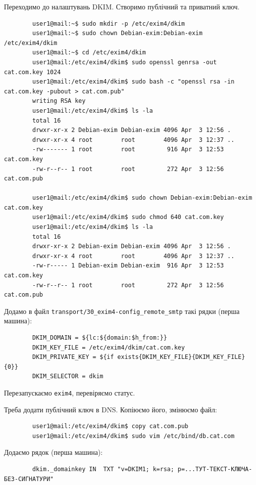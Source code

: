 \documentclass[14pt, a4paper]{extreport}
\begin{document}
	Переходимо до налаштувань DKIM.  Створимо публічний та приватний ключ.
	
	\begin{verbatim}
		user1@mail:~$ sudo mkdir -p /etc/exim4/dkim
		user1@mail:~$ sudo chown Debian-exim:Debian-exim /etc/exim4/dkim
		user1@mail:~$ cd /etc/exim4/dkim
		user1@mail:/etc/exim4/dkim$ sudo openssl genrsa -out cat.com.key 1024
		user1@mail:/etc/exim4/dkim$ sudo bash -c "openssl rsa -in cat.com.key -pubout > cat.com.pub"
		writing RSA key
		user1@mail:/etc/exim4/dkim$ ls -la
		total 16
		drwxr-xr-x 2 Debian-exim Debian-exim 4096 Apr  3 12:56 .
		drwxr-xr-x 4 root        root        4096 Apr  3 12:37 ..
		-rw------- 1 root        root         916 Apr  3 12:53 cat.com.key
		-rw-r--r-- 1 root        root         272 Apr  3 12:56 cat.com.pub
		
		user1@mail:/etc/exim4/dkim$ sudo chown Debian-exim:Debian-exim cat.com.key
		user1@mail:/etc/exim4/dkim$ sudo chmod 640 cat.com.key
		user1@mail:/etc/exim4/dkim$ ls -la
		total 16
		drwxr-xr-x 2 Debian-exim Debian-exim 4096 Apr  3 12:56 .
		drwxr-xr-x 4 root        root        4096 Apr  3 12:37 ..
		-rw-r----- 1 Debian-exim Debian-exim  916 Apr  3 12:53 cat.com.key
		-rw-r--r-- 1 root        root         272 Apr  3 12:56 cat.com.pub
	\end{verbatim}
	
	Додамо в файл \texttt{transport/30\_exim4-config\_remote\_smtp} такі рядки (перша машина):
	
	\begin{verbatim}
		DKIM_DOMAIN = ${lc:${domain:$h_from:}}
		DKIM_KEY_FILE = /etc/exim4/dkim/cat.com.key
		DKIM_PRIVATE_KEY = ${if exists{DKIM_KEY_FILE}{DKIM_KEY_FILE}{0}}
		DKIM_SELECTOR = dkim
	\end{verbatim}
	
	Перезапускаємо \texttt{exim4}, перевіряємо статус.
	
	Треба додати публічний ключ в DNS. Копіюємо його, змінюємо файл:
	
	\begin{verbatim}
		user1@mail:/etc/exim4/dkim$ copy cat.com.pub 
		user1@mail:/etc/exim4/dkim$ sudo vim /etc/bind/db.cat.com 
	\end{verbatim}
	
	Додаємо рядок (перша машина):
	
	\begin{verbatim}
		dkim._domainkey	IN	TXT	"v=DKIM1; k=rsa; p=...ТУТ-ТЕКСТ-КЛЮЧА-БЕЗ-СИГНАТУРИ"
	\end{verbatim}
	
\end{document}

